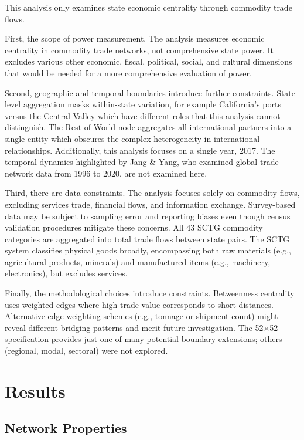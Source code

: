 \documentclass[12pt,oneside]{book}
\begin{document}
This analysis only examines state economic centrality through commodity trade flows.

First, the scope of power measurement. The analysis measures economic centrality in commodity trade networks, not comprehensive state power. It excludes various other economic, fiscal, political, social, and cultural dimensions that would be needed for a more comprehensive evaluation of power.

Second, geographic and temporal boundaries introduce further constraints. State-level aggregation masks within-state variation, for example California's ports versus the Central Valley which have different roles that this analysis cannot distinguish. The Rest of World node aggregates all international partners into a single entity which obscures the complex heterogeneity in international relationships. Additionally, this analysis focuses on a single year, 2017. The temporal dynamics highlighted by Jang \& Yang, who examined global trade network data from 1996 to 2020, are not examined here. 

Third, there are data constraints. The analysis focuses solely on commodity flows, excluding services trade, financial flows, and information exchange. Survey-based data may be subject to sampling error and reporting biases even though census validation procedures mitigate these concerns. All 43 SCTG commodity categories are aggregated into total trade flows between state pairs. The SCTG system classifies physical goods broadly, encompassing both raw materials (e.g., agricultural products, minerals) and manufactured items (e.g., machinery, electronics), but excludes services.

Finally, the methodological choices introduce constraints. Betweenness centrality uses weighted edges where high trade value corresponds to short distances. Alternative edge weighting schemes (e.g., tonnage or shipment count) might reveal different bridging patterns and merit future investigation. The 52$\times$52 specification provides just one of many potential boundary extensions; others (regional, modal, sectoral) were not explored.

\chapter{Results}

\section{Network Properties}
\end{document}
